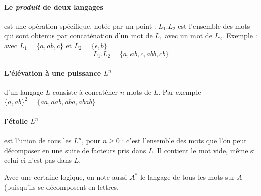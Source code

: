 \paragraph{Le \emph{produit} de deux langages} est une opération 
spécifique, notée par un point : $L_1 . L_2$ est l'ensemble des mots
qui sont obtenus par concaténation d'un mot de $L_1$ avec un mot de
$L_2$.  Exemple : avec $L_1 = \{a, ab, c \}$ et $L_2 = \{ \epsilon, b
\}$
$$L_1.L_2 = \{ a, ab, c, abb, cb \}$$


\paragraph{L'élévation à une puissance  $L^n$} d'un langage $L$ 
consiste à concaténer $n$ mots de $L$.  Par exemple $\{a,ab\}^2 = \{
aa, aab, aba, abab \}$

\paragraph{l'étoile $L^n$} est l'union de tous les $L^n$, 
pour $n \geq 0$ : c'est l'ensemble des mots que l'on peut décomposer
en une suite de facteurs pris dans $L$. Il contient le mot vide, même
si celui-ci n'est pas dans $L$.

Avec une certaine logique, on note aussi $A^*$ le langage de tous les
mots sur $A$ (puisqu'ils se décomposent en lettres.


\clearpage

